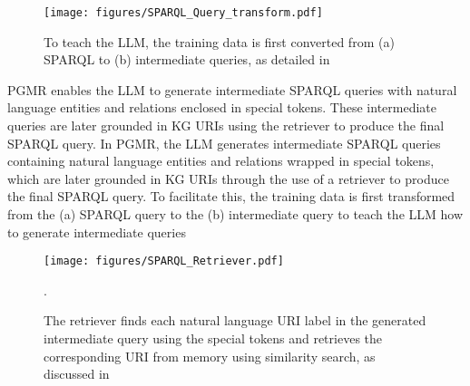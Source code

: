 
\begin{figure}
    \centering
    \texttt{[image: figures/SPARQL\_Query\_transform.pdf]}
    \caption{To teach the LLM, the training data is first converted from (a) SPARQL to (b) intermediate queries, as detailed in }
    \label{fig:transform}
\end{figure}

PGMR enables the LLM to generate intermediate SPARQL queries with natural language entities and relations enclosed in special tokens. These intermediate queries are later grounded in KG URIs using the retriever to produce the final SPARQL query.
In PGMR, the LLM generates intermediate SPARQL queries containing natural language entities and relations wrapped in special tokens, which are later grounded in KG URIs through the use of a retriever to produce the final SPARQL query. To facilitate this, the training data is first transformed from the (a) SPARQL query to the (b) intermediate query to teach the LLM how to generate intermediate queries


\begin{figure*}
    \centering
    \texttt{[image: figures/SPARQL\_Retriever.pdf]}
    \caption{The retriever finds each natural language URI label in the generated intermediate query using the special tokens and retrieves the corresponding URI from memory using similarity search, as discussed in }.
    \label{fig:retriever}
\end{figure*}


